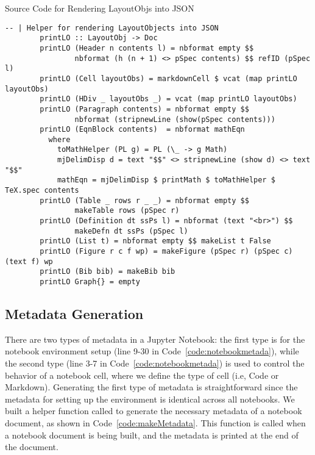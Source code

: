 \begin{listing}[h]
	\caption{Source Code for Rendering LayoutObjs into JSON}
	\label{code:LOtoJSON}
	\begin{lstlisting}[language=haskell1, tabsize=1, basicstyle=\small\ttfamily]
		-- | Helper for rendering LayoutObjects into JSON
		printLO :: LayoutObj -> Doc
		printLO (Header n contents l) = nbformat empty $$
				nbformat (h (n + 1) <> pSpec contents) $$ refID (pSpec l)
		printLO (Cell layoutObs) = markdownCell $ vcat (map printLO layoutObs)
		printLO (HDiv _ layoutObs _) = vcat (map printLO layoutObs) 
		printLO (Paragraph contents) = nbformat empty $$
				nbformat (stripnewLine (show(pSpec contents)))
		printLO (EqnBlock contents)  = nbformat mathEqn
		  where
		    toMathHelper (PL g) = PL (\_ -> g Math)
		    mjDelimDisp d = text "$$" <> stripnewLine (show d) <> text "$$" 
		    mathEqn = mjDelimDisp $ printMath $ toMathHelper $ TeX.spec contents
		printLO (Table _ rows r _ _) = nbformat empty $$
				makeTable rows (pSpec r)
		printLO (Definition dt ssPs l) = nbformat (text "<br>") $$ 
				makeDefn dt ssPs (pSpec l)
		printLO (List t) = nbformat empty $$ makeList t False
		printLO (Figure r c f wp) = makeFigure (pSpec r) (pSpec c) (text f) wp
		printLO (Bib bib) = makeBib bib
		printLO Graph{} = empty 
	\end{lstlisting}
\end{listing}

\subsection{Metadata Generation}
There are two types of metadata in a Jupyter Notebook: the first type is for 
the notebook environment setup (line 9-30 in Code~\ref{code:notebookmetada}), 
while the second type (line 3-7 in Code~\ref{code:notebookmetada}) is used to 
control the behavior of a notebook cell, where we define the type of cell (i.e, 
Code or Markdown). Generating the first type of metadata is straightforward 
since the metadata for setting up the environment is identical across all 
notebooks. We built a helper function called  to generate 
the necessary metadata of a notebook document, as shown in 
Code~\ref{code:makeMetadata}. This function is called when a notebook document 
is being built, and the metadata is printed at the end of the document.

